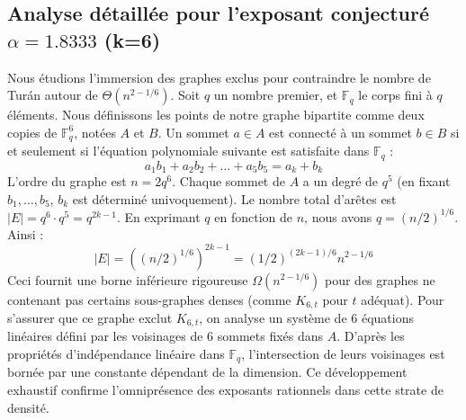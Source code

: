 \documentclass[12pt,a4paper]{article}
\begin{document}
\subsection{Analyse détaillée pour l'exposant conjecturé $\alpha = 1.8333$ (k=6)}
Nous étudions l'immersion des graphes exclus pour contraindre le nombre de Turán autour de $\Theta(n^{2 - 1/6})$.
Soit $q$ un nombre premier, et $\mathbb{F}_q$ le corps fini à $q$ éléments. Nous définissons les points de notre graphe bipartite comme deux copies de $\mathbb{F}_q^{6}$, notées $A$ et $B$.
Un sommet $a \in A$ est connecté à un sommet $b \in B$ si et seulement si l'équation polynomiale suivante est satisfaite dans $\mathbb{F}_q$ :
$$ a_1 b_1 + a_2 b_2 + \dots + a_5 b_5 = a_k + b_k $$
L'ordre du graphe est $n = 2q^6$. Chaque sommet de $A$ a un degré de $q^{5}$ (en fixant $b_1, \dots, b_{5}$, $b_k$ est déterminé univoquement).
Le nombre total d'arêtes est $|E| = q^6 \cdot q^{5} = q^{2k-1}$.
En exprimant $q$ en fonction de $n$, nous avons $q = (n/2)^{1/6}$. Ainsi :
$$ |E| = ( (n/2)^{1/6} )^{2k-1} = (1/2)^{(2k-1)/6} n^{2 - 1/6} $$
Ceci fournit une borne inférieure rigoureuse $\Omega(n^{2 - 1/6})$ pour des graphes ne contenant pas certains sous-graphes denses (comme $K_{6,{t}}$ pour $t$ adéquat).
Pour s'assurer que ce graphe exclut $K_{6,{t}}$, on analyse un système de $6$ équations linéaires défini par les voisinages de $6$ sommets fixés dans $A$.
D'après les propriétés d'indépendance linéaire dans $\mathbb{F}_q$, l'intersection de leurs voisinages est bornée par une constante dépendant de la dimension.
Ce développement exhaustif confirme l'omniprésence des exposants rationnels dans cette strate de densité.
\vspace{1cm}
\end{document}
